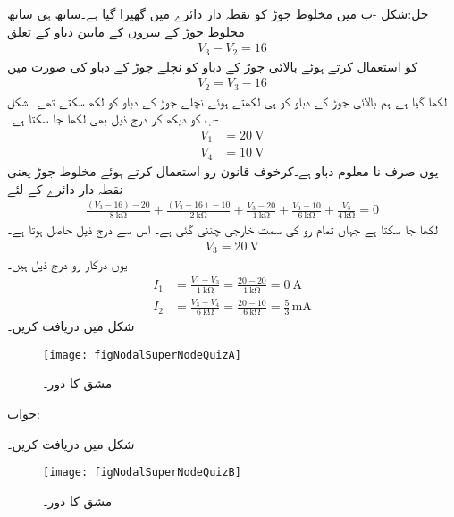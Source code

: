 حل:شکل -ب میں مخلوط جوڑ کو نقطہ دار دائرے میں گھیرا گیا ہے۔ساتھ ہی ساتھ مخلوط جوڑ کے سروں کے مابین دباو کے تعلق
\begin{align*}
V_3-V_2=16
\end{align*}
 کو استعمال کرتے ہوئے بالائی جوڑ کے دباو کو نچلے جوڑ کے دباو کی صورت میں
\begin{align*}
V_2=V_3-16
\end{align*}
 لکھا گیا ہے۔ہم بالائی جوڑ کے دباو کو  ہی لکھتے ہوئے نچلے جوڑ کے دباو کو  لکھ سکتے تھے۔ شکل -ب  کو دیکھ کر درج ذیل بھی لکھا جا سکتا ہے۔
\begin{align*}
V_1&=\SI{20}{\volt}\\
V_4&=\SI{10}{\volt}
\end{align*}
یوں صرف  نا معلوم دباو ہے۔کرخوف قانون رو استعمال کرتے ہوئے مخلوط جوڑ یعنی نقطہ دار دائرے کے لئے 
\begin{align*}
\frac{(V_3-16)-20}{\SI{8}{\kilo\ohm}}+\frac{(V_3-16)-10}{\SI{2}{\kilo\ohm}}+\frac{V_3-20}{\SI{1}{\kilo\ohm}}+\frac{V_3-10}{\SI{6}{\kilo\ohm}}+\frac{V_3}{\SI{4}{\kilo\ohm}}=0
\end{align*}
لکھا جا سکتا ہے جہاں تمام رو کی سمت خارجی چننی گئی ہے۔ اس سے درج ذیل حاصل ہوتا ہے۔
\begin{align*}
V_3=\SI{20}{\volt}
\end{align*}
یوں درکار رو درج ذیل ہیں۔
\begin{align*}
I_1&=\frac{V_1-V_3}{\SI{1}{\kilo\ohm}}=\frac{20-20}{\SI{1}{\kilo\ohm}}=\SI{0}{\ampere}\\
I_2&=\frac{V_3-V_4}{\SI{6}{\kilo\ohm}}=\frac{20-10}{\SI{6}{\kilo\ohm}}=\frac{5}{3}\,\si{\milli\ampere}
\end{align*}
شکل  میں  دریافت کریں۔
\begin{figure}
\centering
\texttt{[image: figNodalSuperNodeQuizA]}
\caption{مشق  کا دور۔}
\label{شکل_جوڑ_مشق_مخلوط_الف}
\end{figure}%

جواب:

شکل  میں  دریافت کریں۔
\begin{figure}
\centering
\texttt{[image: figNodalSuperNodeQuizB]}
\caption{مشق  کا دور۔}
\label{شکل_جوڑ_مشق_مخلوط_ب}
\end{figure}%

